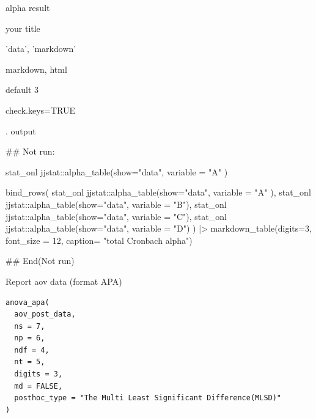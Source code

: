 \documentclass[a4paper]{book}
\begin{document}
%
\begin{Arguments}
\begin{ldescription}
\item[\code{alpha\_data\_res}] alpha result

\item[\code{title}] your title

\item[\code{show}] 'data', 'markdown'

\item[\code{format}] markdown, html

\item[\code{digits}] default 3

\item[\code{check.keys}] check.keys=TRUE

\item[\code{variable}] . output
\end{ldescription}
\end{Arguments}
%
\begin{Examples}
\begin{ExampleCode}
## Not run: 

stat_onl %
   jjstat::alpha_table(show="data", variable = "A" )


bind_rows(
 stat_onl %
   jjstat::alpha_table(show="data", variable = "A" ),
 stat_onl %
   jjstat::alpha_table(show="data", variable = "B"),
 stat_onl %
   jjstat::alpha_table(show="data", variable = "C"),
 stat_onl %
   jjstat::alpha_table(show="data", variable = "D")
) |> markdown_table(digits=3, font_size = 12,
                   caption= "total Cronbach alpha")

## End(Not run)




\end{ExampleCode}
\end{Examples}
%
\begin{Description}
Report aov data (format APA)
\end{Description}
%
\begin{Usage}
\begin{verbatim}
anova_apa(
  aov_post_data,
  ns = 7,
  np = 6,
  ndf = 4,
  nt = 5,
  digits = 3,
  md = FALSE,
  posthoc_type = "The Multi Least Significant Difference(MLSD)"
)
\end{verbatim}
\end{Usage}
\end{document}
